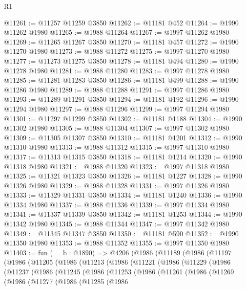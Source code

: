 \begin{lexlean}{R1}
\begin{coremodule}
@11261 := @11257 @11259 @3850
@11262 := @11181 @452
@11264 := @1990 @11262 @1980
@11265 := @1988 @11264
@11267 := @1997 @11262 @1980
@11269 := @11265 @11267 @3850
@11270 := @11181 @457
@11272 := @1990 @11270 @1980
@11273 := @1988 @11272
@11275 := @1997 @11270 @1980
@11277 := @11273 @11275 @3850
@11278 := @11181 @494
@11280 := @1990 @11278 @1980
@11281 := @1988 @11280
@11283 := @1997 @11278 @1980
@11285 := @11281 @11283 @3850
@11286 := @11181 @499
@11288 := @1990 @11286 @1980
@11289 := @1988 @11288
@11291 := @1997 @11286 @1980
@11293 := @11289 @11291 @3850
@11294 := @11181 @192
@11296 := @1990 @11294 @1980
@11297 := @1988 @11296
@11299 := @1997 @11294 @1980
@11301 := @11297 @11299 @3850
@11302 := @11181 @1188
@11304 := @1990 @11302 @1980
@11305 := @1988 @11304
@11307 := @1997 @11302 @1980
@11309 := @11305 @11307 @3850
@11310 := @11181 @1201
@11312 := @1990 @11310 @1980
@11313 := @1988 @11312
@11315 := @1997 @11310 @1980
@11317 := @11313 @11315 @3850
@11318 := @11181 @1214
@11320 := @1990 @11318 @1980
@11321 := @1988 @11320
@11323 := @1997 @11318 @1980
@11325 := @11321 @11323 @3850
@11326 := @11181 @1227
@11328 := @1990 @11326 @1980
@11329 := @1988 @11328
@11331 := @1997 @11326 @1980
@11333 := @11329 @11331 @3850
@11334 := @11181 @1240
@11336 := @1990 @11334 @1980
@11337 := @1988 @11336
@11339 := @1997 @11334 @1980
@11341 := @11337 @11339 @3850
@11342 := @11181 @1253
@11344 := @1990 @11342 @1980
@11345 := @1988 @11344
@11347 := @1997 @11342 @1980
@11349 := @11345 @11347 @3850
@11350 := @11181 @590
@11352 := @1990 @11350 @1980
@11353 := @1988 @11352
@11355 := @1997 @11350 @1980
@11403 := fun (__b : @1890) =>
  @4206
    (@1986
      (@11189
        (@1986
          (@11197
            (@1986
              (@11205
                (@1986
                  (@11213
                    (@1986
                      (@11221
                        (@1986
                          (@11229
                            (@1986
                              (@11237
                                (@1986
                                  (@11245
                                    (@1986
                                      (@11253
                                        (@1986
                                          (@11261
                                            (@1986
                                              (@11269
                                                (@1986
                                                  (@11277
                                                    (@1986
                                                      (@11285
                                                        (@1986

\end{coremodule}
\end{lexlean}
